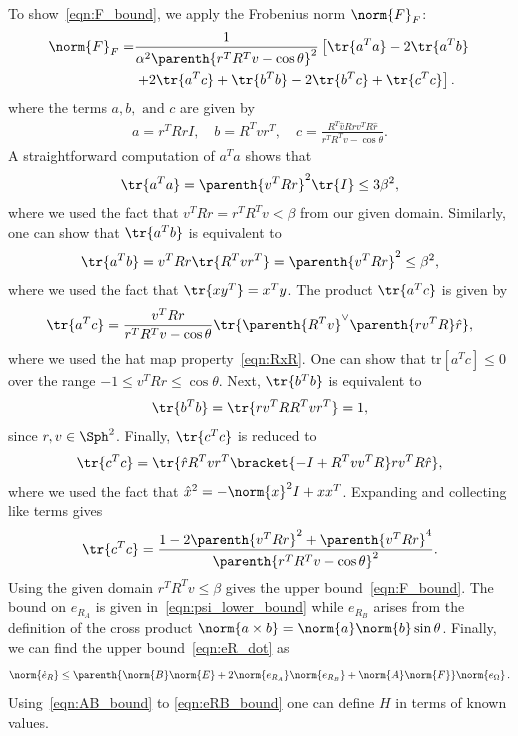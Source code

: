 To show~\cref{eqn:F_bound}, we apply the Frobenius norm \( \norm{F}_F \):
\begin{align*}
	\norm{F}_F =& \frac{1}{\alpha ^2 \parenth{r^T R^T v - \cos \theta}^2} \left[\tr{a^T a} - 2 \tr{a^T b} \right. \\
	&\left.+ 2 \tr{a^T c } + \tr{b^T b}  - 2 \tr{b^T c} + \tr{c^T c}\right] .
\end{align*}
where the terms \( a, b, \text{ and } c \) are given by
\begin{gather*}
	a = r^T R r I , \quad	b = R^T v r^T , \quad c = \frac{R^T \hat{v} R r v^T R \hat{r}}{r^T R^T v - \cos \theta}.
\end{gather*}
A straightforward computation of \( a^T a \) shows that
\begin{gather*}
	\tr{a^T a} = \parenth{v^T R r}^2 \tr{I} \leq 3 \beta^2 ,
\end{gather*}
where we used the fact that \( v^T R r = r^T R^T v < \beta \) from our given domain.
Similarly, one can show that \( \tr{a^T b} \) is equivalent to
\begin{gather*}
	\tr{a^T b} = v^T R r \tr{R^T v r^T} = \parenth{v^T R r}^2 \leq \beta^2 ,
\end{gather*} 
where we used the fact that \( \tr{x y^T} = x^T y \).
The product \( \tr{a^T c} \) is given by
\begin{gather*}
	\tr{a^T c} = \frac{v^T R r}{r^T R^T v - \cos \theta} \tr{\parenth{R^T v}^\vee \parenth{r v^T R} \hat{r} } ,
\end{gather*}
where we used the hat map property~\cref{eqn:RxR}.
One can show that \(\mathrm{tr}[a^T c] \leq 0 \) over the range \( -1 \leq v^T R r \leq \cos \theta \). 
Next, \( \tr{b^T b}\) is equivalent to
\begin{gather*}
	\tr{b^T b} = \tr{r v^T R R^T v r^T} = 1 ,
\end{gather*}
since \( r,v \in \Sph^2\).
Finally, \( \tr{c^T c} \) is reduced to
\begin{gather*}
	\tr{c^T c} = \tr{\hat{r} R^T v r^T \bracket{-I + R^T v v^T R} r v^T R \hat{r}} ,
\end{gather*}
where we used the fact that \( \hat{x}^2 = - \norm{x}^2 I + x x^T\).
Expanding and collecting like terms gives
\begin{gather*}
	\tr{c^T c } = \frac{1 - 2\parenth{v^T R r}^2 + \parenth{v^T R r}^4}{\parenth{r^T R^T v - \cos \theta}^2} . 
\end{gather*}
Using the given domain \( r^T R^T v \leq \beta \) gives the upper bound~\cref{eqn:F_bound}.
The bound on \( e_{R_A} \) is given in~\cref{eqn:psi_lower_bound} while \( e_{R_B} \) arises from the definition of the cross product \( \norm{a \times b} = \norm{a} \norm{b} \sin \theta \).
Finally, we can find the upper bound~\cref{eqn:eR_dot} as
\begin{gather*}
	\norm{\dot{e}_R} \leq \parenth{\norm{B} \norm{E} + 2 \norm{e_{R_A}} \norm{e_{R_B}} + \norm{A}\norm{F}} \norm{e_\Omega} \, .
\end{gather*}
Using~\cref{eqn:AB_bound} to \cref{eqn:eRB_bound} one can define \( H \) in terms of known values.

